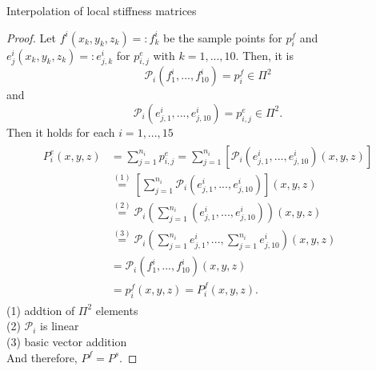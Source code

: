\documentclass[a4paper,11pt,reqno]{amsart}
\numberwithin{figure}{section}
\numberwithin{table}{section}
\numberwithin{figure}{subsection}
\def\P{\mathcal{P}}
\begin{document}
\begin{section}{Interpolation of local stiffness matrices}
\begin{proof}
Let $f^i(x_k,y_k,z_k) =:f_k^i$ be the sample points
for $p^f_i$ and $e^i_j(x_k,y_k,z_k) =:e_{j,k}^i$ for $p^e_{i,j}$
with $k = 1,...,10$.
Then, it is
\begin{equation*}
\P_i(f^i_1,...,f^i_{10}) = p_i^f \in \Pi^2
\end{equation*}
and
\begin{equation*}
\P_i(e^i_{j,1},...,e^i_{j,10}) = p_{i,j}^e \in \Pi^2.
\end{equation*}
Then it holds for each $i= 1,...,15$
\begin{align*}
\begin{split}
P^e_i(x,y,z) &= \sum_{j=1}^{n_i} p^e_{i,j} 
 = \sum_{j=1}^{n_i}\left[\P_i\left(e^i_{j,1},...,e^i_{j,10}\right)(x,y,z)\right] \\
 &\stackrel{(1)}{=} \left[\sum_{j=1}^{n_i}\P_i\left(e^i_{j,1},...,e^i_{j,10}\right)\right](x,y,z) \\
 &\stackrel{(2)}{=} \P_i\left(\sum_{j=1}^{n_i}\left(e^i_{j,1},...,e^i_{j,10}\right)\right)(x,y,z) \\
 &\stackrel{(3)}{=} \P_i\left(\sum_{j=1}^{n_i}e^i_{j,1},...,\sum_{j=1}^{n_i}e^i_{j,10}\right)(x,y,z) \\
 &= \P_i\left(f^i_1,...,f^i_{10}\right)(x,y,z) \\
 &= p_i^f(x,y,z) = P_i^f(x,y,z).
\end{split}
\end{align*}
(1) addtion of $\Pi^2$ elements\\
(2) $\P_i$ is linear \\
(3) basic vector addition\\
And therefore, $P^f = P^s$.
\end{proof}

\end{section}

\clearpage
\end{document}
